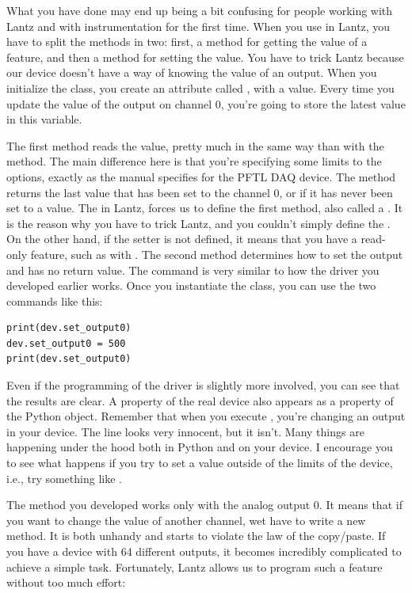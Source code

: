 What you have done may end up being a bit confusing for people working with Lantz and with instrumentation for the first time. When you use  in Lantz, you have to split the methods in two: first, a method for getting the value of a feature, and then a method for setting the value. You have to trick Lantz because our device doesn't have a way of knowing the value of an output. When you initialize the class, you create an attribute called , with a  value. Every time you update the value of the output on channel 0, you're going to store the latest value in this variable.

The first method reads the value, pretty much in the same way than with the  method. The main difference here is that you're specifying some limits to the options, exactly as the manual specifies for the {PFTL DAQ} device. The method  returns the last value that has been set to the channel 0, or  if it has never been set to a value. The  in Lantz, forces us to define the first method, also called a . It is the reason why you have to trick Lantz, and you couldn't simply define the . On the other hand, if the setter is not defined, it means that you have a read-only feature, such as with . The second method determines how to set the output and has no return value. The command is very similar to how the driver you developed earlier works. Once you instantiate the class, you can use the two commands like this:

\begin{verbatim}
print(dev.set_output0)
dev.set_output0 = 500
print(dev.set_output0)
\end{verbatim}

Even if the programming of the driver is slightly more involved, you can see that the results are clear. A property of the real device also appears as a property of the Python object. Remember that when you execute , you're changing an output in your device. The line looks very innocent, but it isn't. Many things are happening under the hood both in Python and on your device. I encourage you to see what happens if you try to set a value outside of the limits of the device, i.e., try something like .

The method you developed works only with the analog output 0. It means that if you want to change the value of another channel, wet have to write a new method. It is both unhandy and starts to violate the law of the copy/paste. If you have a device with 64 different outputs, it becomes incredibly complicated to achieve a simple task. Fortunately, Lantz allows us to program such a feature without too much effort:

